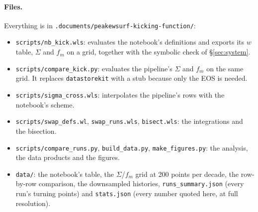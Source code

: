 \documentclass[11pt,a4paper]{article}
\newcommand{\code}[1]{\texttt{#1}}
\begin{document}
\paragraph{Files.}
Everything is in \code{.documents/peakewsurf-kicking-function/}:
\begin{itemize}
\item \code{scripts/nb\_kick.wls}: evaluates the notebook's definitions and exports its $w$
  table, $\Sigma$ and $f_m$ on a grid, together with the symbolic check of \S\ref{sec:system}.
\item \code{scripts/compare\_kick.py}: evaluates the pipeline's $\Sigma$ and $f_m$ on the same
  grid. It replaces \code{datastorekit} with a stub because only the EOS is needed.
\item \code{scripts/sigma\_cross.wls}: interpolates the pipeline's rows with the notebook's scheme.
\item \code{scripts/swap\_defs.wl}, \code{swap\_runs.wls}, \code{bisect.wls}: the integrations
  and the bisection.
\item \code{scripts/compare\_runs.py}, \code{build\_data.py}, \code{make\_figures.py}: the
  analysis, the data products and the figures.
\item \code{data/}: the notebook's table, the $\Sigma$/$f_m$ grid at 200 points per decade,
  the row-by-row comparison, the downsampled histories, \code{runs\_summary.json} (every run's
  turning points) and \code{stats.json} (every number quoted here, at full resolution).
\end{itemize}
\end{document}
